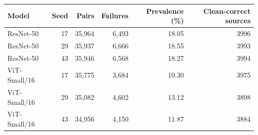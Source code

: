 \begin{tabular}{lrrrrr}
\toprule
Model & Seed & Pairs & Failures & Prevalence (\%) & Clean-correct sources \\
\midrule
ResNet-50 & 17 & 35,964 & 6,493 & 18.05 & 3996 \\
ResNet-50 & 29 & 35,937 & 6,666 & 18.55 & 3993 \\
ResNet-50 & 43 & 35,946 & 6,568 & 18.27 & 3994 \\
ViT-Small/16 & 17 & 35,775 & 3,684 & 10.30 & 3975 \\
ViT-Small/16 & 29 & 35,082 & 4,602 & 13.12 & 3898 \\
ViT-Small/16 & 43 & 34,956 & 4,150 & 11.87 & 3884 \\
\bottomrule
\end{tabular}
